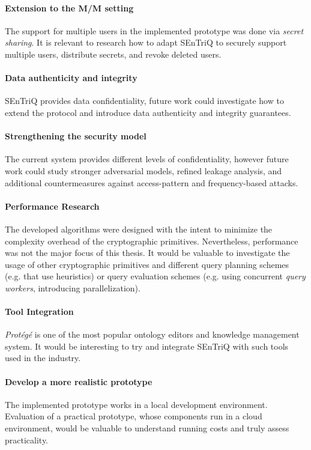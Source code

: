 \paragraph*{Extension to the \gls{M/M} setting} The support for multiple users in the implemented prototype was done via \textit{secret sharing}. It is relevant to research how to adapt \gls{SEnTriQ} to securely support multiple users, distribute secrets, and revoke deleted users.

\paragraph*{Data authenticity and integrity} \gls{SEnTriQ} provides data confidentiality, future work could investigate how to extend the protocol and introduce data authenticity and integrity guarantees.

\paragraph*{Strengthening the security model} The current system provides different levels of confidentiality, however future work could study stronger adversarial models, refined leakage analysis, and additional countermeasures against access-pattern and frequency-based attacks.

\paragraph*{Performance Research} The developed algorithms were designed with the intent to minimize the complexity overhead of the cryptographic primitives. Nevertheless, performance was not the major focus of this thesis. It would be valuable to investigate the usage of other cryptographic primitives and different query planning schemes (e.g. that use heuristics) or query evaluation schemes (e.g. using concurrent \emph{query workers}, introducing parallelization).

\paragraph*{Tool Integration} \emph{Protégé} is one of the most popular ontology editors and knowledge management system. It would be interesting to try and integrate \gls{SEnTriQ} with such tools used in the industry. 

\paragraph*{Develop a more realistic prototype} The implemented prototype works in a local development environment. Evaluation of a practical prototype, whose components run in a cloud environment, would be valuable to understand running costs and truly assess practicality.